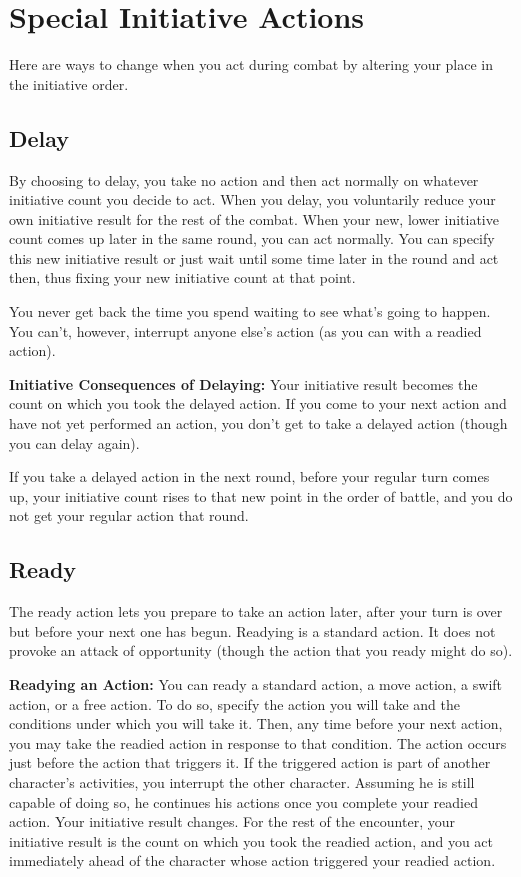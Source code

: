 \section{Special Initiative Actions}
Here are ways to change when you act during combat by altering your place in the initiative order.

\subsection{Delay}
By choosing to delay, you take no action and then act normally on whatever initiative count you decide to act. When you delay, you voluntarily reduce your own initiative result for the rest of the combat. When your new, lower initiative count comes up later in the same round, you can act normally. You can specify this new initiative result or just wait until some time later in the round and act then, thus fixing your new initiative count at that point.

You never get back the time you spend waiting to see what's going to happen. You can't, however, interrupt anyone else's action (as you can with a readied action).

\textbf{Initiative Consequences of Delaying:} Your initiative result becomes the count on which you took the delayed action. If you come to your next action and have not yet performed an action, you don't get to take a delayed action (though you can delay again).

If you take a delayed action in the next round, before your regular turn comes up, your initiative count rises to that new point in the order of battle, and you do not get your regular action that round.

\subsection{Ready}
The ready action lets you prepare to take an action later, after your turn is over but before your next one has begun. Readying is a standard action. It does not provoke an attack of opportunity (though the action that you ready might do so).

\textbf{Readying an Action:} You can ready a standard action, a move action, a swift action, or a free action. To do so, specify the action you will take and the conditions under which you will take it. Then, any time before your next action, you may take the readied action in response to that condition. The action occurs just before the action that triggers it. If the triggered action is part of another character's activities, you interrupt the other character. Assuming he is still capable of doing so, he continues his actions once you complete your readied action. Your initiative result changes. For the rest of the encounter, your initiative result is the count on which you took the readied action, and you act immediately ahead of the character whose action triggered your readied action.

